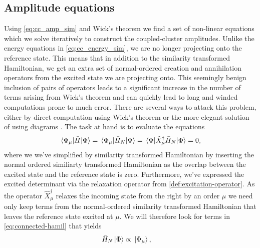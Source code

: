         \subsection{Amplitude equations}
            Using \autoref{eq:cc_amp_sim} and Wick's theorem we find a set of
            non-linear equations which we solve iteratively to construct the
            coupled-cluster amplitudes.
            Unlike the energy equations in \autoref{eq:cc_energy_sim}, we are no
            longer projecting onto the reference state.
            This means that in addition to the similarity transformed
            Hamiltonian, we get an extra set of normal-ordered creation and
            annihilation operators from the excited state we are projecting
            onto.
            This seemingly benign inclusion of pairs of operators leads to a
            significant increase in the number of terms arising from Wick's
            theorem and can quickly lead to long and winded computations prone
            to much error.
            There are several ways to attack this problem, either by direct
            computation using Wick's theorem \cite{crawford2000introduction} or
            the more elegant solution of using diagrams
            \cite{crawford2000introduction, shavitt2009many}.
            The task at hand is to evaluate the equations
            \begin{align}
                \mel*{\Phi_{\mu}}{\bar{H}}{\Phi}
                = \mel*{\Phi_{\mu}}{\bar{H}_N}{\Phi}
                = \mel*{\Phi}{
                    \hat{X}^{\dagger}_{\mu}\bar{H}_N
                }{\Phi}
                = 0,
            \end{align}
            where we we've simplified by similarity transformed Hamiltonian
            by inserting the normal ordered similiarty transformed Hamiltonian
            as the overlap between the excited state and the reference state is
            zero.
            Furthermore, we've expressed the excited determinant via the
            relaxation operator from \autoref{def:excitation-operator}.
            As the operator $\hat{X}^{\dagger}_{\mu}$ relaxes the incoming state
            from the right by an order $\mu$ we need only keep terms from the
            normal-ordered similarity transformed Hamiltonian that leaves the
            reference state excited at $\mu$.
            We will therefore look for terms in \autoref{eq:connected-hamil}
            that yields
            \begin{align}
                \bar{H}_N\ket*{\Phi}
                &\propto \ket*{\Phi_{\mu}},
            \end{align}
